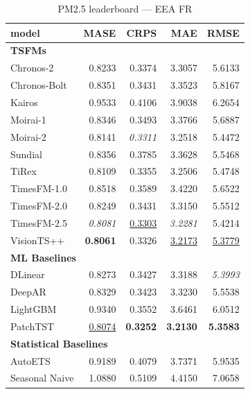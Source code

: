 \begin{table}[H]
\caption{PM2.5 leaderboard --- EEA FR}
\centering
\begin{small}
\begin{tabular}{lrrrr}
\toprule
model & MASE & CRPS & MAE & RMSE \\
\midrule
\multicolumn{5}{l}{\textbf{TSFMs}} \\
Chronos-2 & 0.8233 & 0.3374 & 3.3057 & 5.6133 \\
Chronos-Bolt & 0.8351 & 0.3431 & 3.3523 & 5.8167 \\
Kairos & 0.9533 & 0.4106 & 3.9038 & 6.2654 \\
Moirai-1 & 0.8346 & 0.3493 & 3.3766 & 5.6887 \\
Moirai-2 & 0.8141 & \textit{0.3311} & 3.2518 & 5.4472 \\
Sundial & 0.8356 & 0.3785 & 3.3628 & 5.5468 \\
TiRex & 0.8109 & 0.3355 & 3.2506 & 5.4748 \\
TimesFM-1.0 & 0.8518 & 0.3589 & 3.4220 & 5.6522 \\
TimesFM-2.0 & 0.8249 & 0.3431 & 3.3150 & 5.5512 \\
TimesFM-2.5 & \textit{0.8081} & \underline{0.3303} & \textit{3.2281} & 5.4214 \\
VisionTS++ & \textbf{0.8061} & 0.3326 & \underline{3.2173} & \underline{5.3779} \\
\midrule
\multicolumn{5}{l}{\textbf{ML Baselines}} \\
DLinear & 0.8273 & 0.3427 & 3.3188 & \textit{5.3993} \\
DeepAR & 0.8329 & 0.3423 & 3.3230 & 5.5538 \\
LightGBM & 0.9340 & 0.3552 & 3.6461 & 6.0512 \\
PatchTST & \underline{0.8074} & \textbf{0.3252} & \textbf{3.2130} & \textbf{5.3583} \\
\midrule
\multicolumn{5}{l}{\textbf{Statistical Baselines}} \\
AutoETS & 0.9189 & 0.4079 & 3.7371 & 5.9535 \\
Seasonal Naive & 1.0880 & 0.5109 & 4.4150 & 7.0658 \\
\bottomrule
\end{tabular}
\end{small}
\end{table}